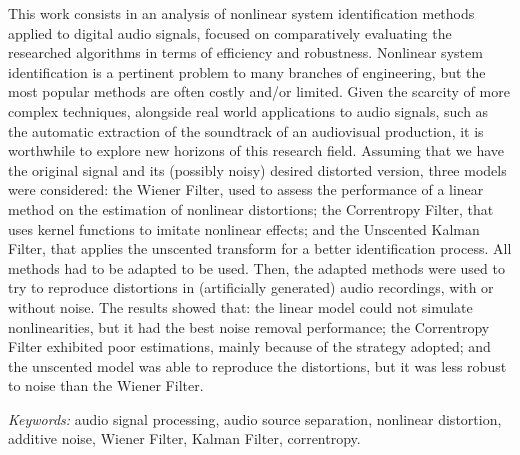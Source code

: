 \begin{foreignabstract}

This work consists in an analysis of nonlinear system identification methods applied to digital audio signals, focused on comparatively evaluating the researched algorithms in terms of efficiency and robustness. Nonlinear system identification is a pertinent problem to many branches of engineering, but the most popular methods are often costly and/or limited. Given the scarcity of more complex techniques, alongside real world applications to audio signals, such as the automatic extraction of the soundtrack of an audiovisual production, it is worthwhile to explore new horizons of this research field. Assuming that we have the original signal and its (possibly noisy) desired distorted version, three models were considered: the Wiener Filter, used to assess the performance of a linear method on the estimation of nonlinear distortions; the Correntropy Filter, that uses kernel functions to imitate nonlinear effects; and the Unscented Kalman Filter, that applies the unscented transform for a better identification process. All methods had to be adapted to be used. Then, the adapted methods were used to try to reproduce distortions in (artificially generated) audio recordings, with or without noise. The results showed that: the linear model could not simulate nonlinearities, but it had the best noise removal performance; the Correntropy Filter exhibited poor estimations, mainly because of the strategy adopted; and the unscented model was able to reproduce the distortions, but it was less robust to noise than the Wiener Filter.

\vspace*{7mm}
\noindent \textit{Keywords:} audio signal processing, audio source separation, nonlinear distortion, additive noise, Wiener Filter, Kalman Filter, correntropy.

\end{foreignabstract}
